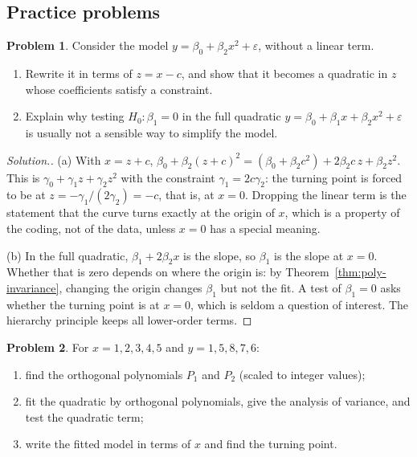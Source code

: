 \documentclass[11pt,a4paper]{article}
\numberwithin{equation}{section}
\theoremstyle{definition}
\newtheorem{problemx}{Problem}[subsection]
\newenvironment{problem}{\begin{problemx}}{\end{problemx}}
\newenvironment{solution}
  {\renewcommand{\qedsymbol}{}\begin{proof}[\textit{Solution}.]}
  {\end{proof}}
\begin{document}
\subsection{Practice problems}
\begin{problem}\label{prob:hierarchy}
Consider the model $y = \beta_0 + \beta_2x^2 + \varepsilon$, without a linear term.
\begin{enumerate}[label=(\alph*)]
\item Rewrite it in terms of $z = x - c$, and show that it becomes a quadratic in $z$ whose coefficients satisfy a
constraint.
\item Explain why testing $H_0\colon \beta_1 = 0$ in the full quadratic $y = \beta_0 + \beta_1x + \beta_2x^2 + \varepsilon$ is usually not a sensible
way to simplify the model.
\end{enumerate}
\end{problem}

\begin{solution}
(a) With $x = z + c$, $\beta_0 + \beta_2(z + c)^2 = (\beta_0 + \beta_2c^2) + 2\beta_2c\,z + \beta_2z^2$. This is $\gamma_0 + \gamma_1z + \gamma_2z^2$ with the
constraint $\gamma_1 = 2c\gamma_2$: the turning point is forced to be at $z = -\gamma_1/(2\gamma_2) = -c$, that is, at $x = 0$. Dropping the
linear term is the statement that the curve turns exactly at the origin of $x$, which is a property of the
coding, not of the data, unless $x = 0$ has a special meaning.

(b) In the full quadratic, $\beta_1 + 2\beta_2x$ is the slope, so $\beta_1$ is the slope at $x = 0$. Whether that is zero depends on
where the origin is: by Theorem~\ref{thm:poly-invariance}, changing the origin changes $\beta_1$ but not the fit. A test of
$\beta_1 = 0$ asks whether the turning point is at $x = 0$, which is seldom a question of interest. The hierarchy
principle keeps all lower-order terms.
\end{solution}

\begin{problem}\label{prob:orth5}
For $x = 1, 2, 3, 4, 5$ and $y = 1, 5, 8, 7, 6$:
\begin{enumerate}[label=(\alph*)]
\item find the orthogonal polynomials $P_1$ and $P_2$ (scaled to integer values);
\item fit the quadratic by orthogonal polynomials, give the analysis of variance, and test the quadratic term;
\item write the fitted model in terms of $x$ and find the turning point.
\end{enumerate}
\end{problem}
\end{document}
